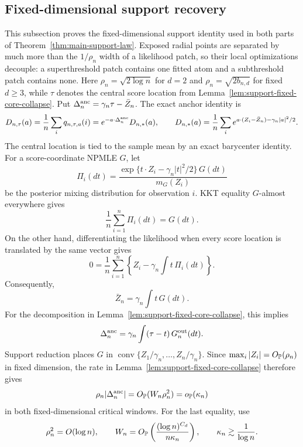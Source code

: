 \subsection{Fixed-dimensional support recovery}
\label{sec:higher-dimensional-support-counts}

This subsection proves the fixed-dimensional support identity used in both
parts of Theorem~\ref{thm:main-support-law}. Exposed radial points are
separated by much more than the \(1/\rho_n\) width of a likelihood patch, so
their local optimizations decouple: a superthreshold patch contains one fitted
atom and a subthreshold patch contains none. Here
\(\rho_n=\sqrt{2\log n}\) for \(d=2\) and
\(\rho_n=\sqrt{2b_{n,d}}\) for fixed \(d\ge3\), while \(\tau\) denotes the
central score location from Lemma~\ref{lem:support-fixed-core-collapse}. Put
\(\Delta_n^{\rm anc}=\gamma_n\tau-\bar Z_n\). The exact anchor identity is
\begin{equation}
\label{eq:support-high-d-anchor-translation}
 D_{n,\tau}(a)
 =\frac1n\sum_iq_{n,\tau,a}(i)
 =e^{-a\cdot\Delta_n^{\rm anc}}D_{n,*}(a),
 \qquad
 D_{n,*}(a)=\frac1n\sum_i
 e^{a\cdot(Z_i-\bar Z_n)-\gamma_n|a|^2/2}.
\end{equation}
The central location is tied to the sample mean by an exact barycenter
identity. For a score-coordinate NPMLE \(G\), let
\[
 \Pi_i(dt)=
 \frac{\exp\{t\cdot Z_i-\gamma_n|t|^2/2\}\,G(dt)}{m_G(Z_i)}
\]
be the posterior mixing distribution for observation \(i\). KKT equality
\(G\)-almost everywhere gives
\[
 \frac1n\sum_{i=1}^n\Pi_i(dt)=G(dt).
\]
On the other hand, differentiating the likelihood when every score location is
translated by the same vector gives
\[
 0=\frac1n\sum_{i=1}^n
 \left\{Z_i-\gamma_n\int t\,\Pi_i(dt)\right\}.
\]
Consequently,
\begin{equation}
\label{eq:support-npmle-barycenter}
    \bar Z_n=\gamma_n\int t\,G(dt).
\end{equation}
For the decomposition in Lemma~\ref{lem:support-fixed-core-collapse}, this
implies
\[
 \Delta_n^{\rm anc}
 =\gamma_n\int(\tau-t)\,G_n^{\rm out}(dt).
\]
Support reduction places \(G\) in
\(\operatorname{conv}\{Z_1/\gamma_n,\ldots,Z_n/\gamma_n\}\). Since
\(\max_i|Z_i|=O_{\mathbb P}(\rho_n)\) in fixed dimension, the rate in
Lemma~\ref{lem:support-fixed-core-collapse} therefore gives
\begin{equation}
\label{eq:support-high-d-anchor-error}
    \rho_n|\Delta_n^{\rm anc}|
    =O_{\mathbb P}(W_n\rho_n^2)
    =o_{\mathbb P}(\kappa_n)
\end{equation}
in both fixed-dimensional critical windows. For the last equality, use
\[
 \rho_n^2=O(\log n),\qquad
 W_n=O_{\mathbb P}\left(\frac{(\log n)^{C_d}}{n\kappa_n}\right),
 \qquad \kappa_n\gtrsim\frac1{\log n}.
\]

